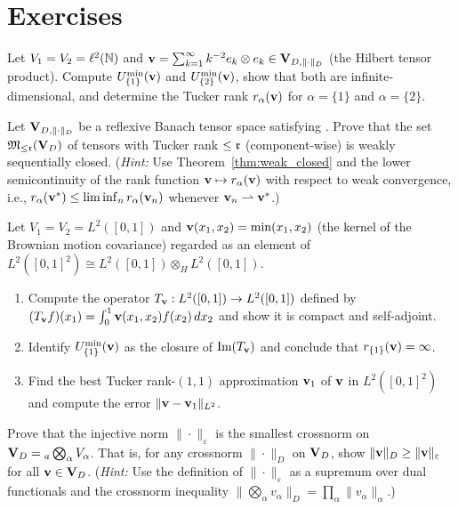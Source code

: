 \section{Exercises}
\label{sec:min:exercises}

\begin{exercise}
Let $V_1 = V_2 = \ell^2(\mathbb{N})$ and $\mathbf{v} = \sum_{k=1}^\infty k^{-2}
e_k \otimes e_k \in \mathbf{V}_{D,\|\cdot\|_D}$ (the Hilbert tensor product). Compute
$U^{\min}_{\{1\}}(\mathbf{v})$ and $U^{\min}_{\{2\}}(\mathbf{v})$, show that both are
infinite-dimensional, and determine the Tucker rank $r_\alpha(\mathbf{v})$
for $\alpha = \{1\}$ and $\alpha = \{2\}$.
\end{exercise}

\begin{exercise}
Let $\mathbf{V}_{D,\|\cdot\|_D}$ be a reflexive Banach tensor space satisfying \condINJ.
Prove that the set $\mathfrak{M}_{\leq\mathfrak{r}}(\mathbf{V}_D)$ of tensors with Tucker rank
$\leq \mathfrak{r}$ (component-wise) is weakly sequentially closed. (\emph{Hint:}
Use Theorem~\ref{thm:weak_closed} and the lower semicontinuity of the
rank function $\mathbf{v} \mapsto r_\alpha(\mathbf{v})$ with respect to weak convergence,
i.e., $r_\alpha(\mathbf{v}^*) \leq \liminf_n r_\alpha(\mathbf{v}_n)$ whenever
$\mathbf{v}_n \rightharpoonup \mathbf{v}^*$.)
\end{exercise}

\begin{exercise}
Let $V_1 = V_2 = L^2([0,1])$ and $\mathbf{v}(x_1, x_2) = \min(x_1, x_2)$
(the kernel of the Brownian motion covariance) regarded as an element of
$L^2([0,1]^2) \cong L^2([0,1]) \otimes_H L^2([0,1])$.
\begin{enumerate}
\item[\textup{(a)}] Compute the operator $T_{\mathbf{v}}: L^2([0,1]) \to L^2([0,1])$
    defined by $(T_{\mathbf{v}} f)(x_1) = \int_0^1 \mathbf{v}(x_1, x_2) f(x_2)\,dx_2$
    and show it is compact and self-adjoint.
\item[\textup{(b)}] Identify $U^{\min}_{\{1\}}(\mathbf{v})$ as the closure of
    $\mathrm{Im}(T_{\mathbf{v}})$ and conclude that $r_{\{1\}}(\mathbf{v}) = \infty$.
\item[\textup{(c)}] Find the best Tucker rank-$(1,1)$ approximation
    $\mathbf{v}_1$ of $\mathbf{v}$ in $L^2([0,1]^2)$ and compute the error
    $\|\mathbf{v} - \mathbf{v}_1\|_{L^2}$.
\end{enumerate}
\end{exercise}

\begin{exercise}
Prove that the injective norm $\|\cdot\|_\varepsilon$ is the smallest
crossnorm on $\mathbf{V}_D = {}_a\bigotimes_\alpha V_\alpha$. That is, for any
crossnorm $\|\cdot\|_D$ on $\mathbf{V}_D$, show $\|\mathbf{v}\|_D \geq \|\mathbf{v}\|_\varepsilon$
for all $\mathbf{v} \in \mathbf{V}_D$. (\emph{Hint:} Use the definition of
$\|\cdot\|_\varepsilon$ as a supremum over dual functionals and the
crossnorm inequality $\|\bigotimes_\alpha v_\alpha\|_D = \prod_\alpha
\|v_\alpha\|_\alpha$.)
\end{exercise}

